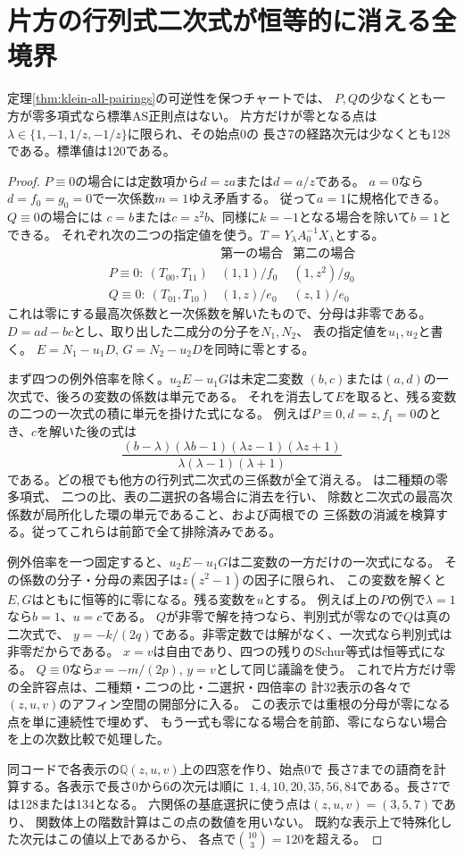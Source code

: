 \section{片方の行列式二次式が恒等的に消える全境界}
\label{sec:single-zero-pairings}
\begin{theorem}\label{thm:single-zero-pairings}
定理\ref{thm:klein-all-pairings}の可逆性を保つチャートでは、
$P,Q$の少なくとも一方が零多項式なら標準AS正則点はない。
片方だけが零となる点は
$\lambda\in\{1,-1,1/z,-1/z\}$に限られ、その始点0の
長さ7の経路次元は少なくとも128である。標準値は120である。
\end{theorem}
\begin{proof}
$P\equiv0$の場合には定数項から$d=za$または$d=a/z$である。
$a=0$なら$d=f_0=g_0=0$で一次係数$m=1$ゆえ矛盾する。
従って$a=1$に規格化できる。$Q\equiv0$の場合には
$c=b$または$c=z^2b$、同様に$k=-1$となる場合を除いて$b=1$とできる。
それぞれ次の二つの指定値を使う。$T=Y_\lambda A_0^{-1} X_\lambda$とする。
\[
\begin{array}{c|c|c}
 &\text{第一の場合}&\text{第二の場合}\\\hline
 P\equiv0:\ (T_{00},T_{11}) &(1,1)/f_0&(1,z^2)/g_0\\
 Q\equiv0:\ (T_{01},T_{10}) &(1,z)/e_0&(z,1)/e_0
\end{array}
\]
これは零にする最高次係数と一次係数を解いたもので、分母は非零である。
$D=ad-bc$とし、取り出した二成分の分子を$N_1,N_2$、
表の指定値を$u_1,u_2$と書く。
$E=N_1-u_1D$, $G=N_2-u_2D$を同時に零とする。

まず四つの例外倍率を除く。$u_2E-u_1G$は未定二変数
$(b,c)$または$(a,d)$の一次式で、後ろの変数の係数は単元である。
それを消去して$E$を取ると、残る変数の二つの一次式の積に単元を掛けた式になる。
例えば$P\equiv0,d=z,f_1=0$のとき、$c$を解いた後の式は
\[
 \frac{(b-\lambda)(\lambda b-1)(\lambda z-1)(\lambda z+1)}
 {\lambda(\lambda-1)(\lambda+1)}
\]
である。どの根でも他方の行列式二次式の三係数が全て消える。
は二種類の零多項式、
二つの比、表の二選択の各場合に消去を行い、
除数と二次式の最高次係数が局所化した環の単元であること、および両根での
三係数の消滅を検算する。従ってこれらは前節で全て排除済みである。

例外倍率を一つ固定すると、$u_2E-u_1G$は二変数の一方だけの一次式になる。
その係数の分子・分母の素因子は$z(z^2-1)$の因子に限られ、
この変数を解くと$E,G$はともに恒等的に零になる。残る変数を$u$とする。
例えば上の$P$の例で$\lambda=1$なら$b=1$、$u=c$である。
$Q$が非零で解を持つなら、判別式が零なので$Q$は真の二次式で、
$y=-k/(2q)$である。非零定数では解がなく、一次式なら判別式は非零だからである。
$x=v$は自由であり、四つの残りのSchur等式は恒等式になる。
$Q\equiv0$なら$x=-m/(2p)$, $y=v$として同じ議論を使う。
これで片方だけ零の全許容点は、二種類・二つの比・二選択・四倍率の
計32表示の各々で$(z,u,v)$のアフィン空間の開部分に入る。
この表示では重根の分母が零になる点を単に連続性で埋めず、
もう一式も零になる場合を前節、零にならない場合を上の次数比較で処理した。

同コードで各表示の$\mathbb Q(z,u,v)$上の四窓を作り、始点0で
長さ7までの語商を計算する。各表示で長さ0から6の次元は順に
$1,4,10,20,35,56,84$である。長さ7では128または134となる。
六関係の基底選択に使う点は$(z,u,v)=(3,5,7)$であり、
関数体上の階数計算はこの点の数値を用いない。
既約な表示上で特殊化した次元はこの値以上であるから、
各点で$\binom{10}{3}=120$を超える。
\end{proof}
